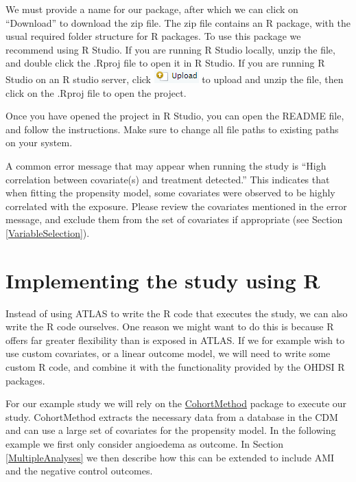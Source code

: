 \documentclass[11pt]{book}
\theoremstyle{definition}
\theoremstyle{definition}
\theoremstyle{definition}
\theoremstyle{remark}
\begin{document}
We must provide a name for our package, after which we can click on ``Download'' to download the zip file. The zip file contains an R package, with the usual required folder structure for R packages. \citep{Wickham_2015} To use this package we recommend using R Studio. If you are running R Studio locally, unzip the file, and double click the .Rproj file to open it in R Studio. If you are running R Studio on an R studio server, click \includegraphics{images/PopulationLevelEstimation/upload.png} to upload and unzip the file, then click on the .Rproj file to open the project.

Once you have opened the project in R Studio, you can open the README file, and follow the instructions. Make sure to change all file paths to existing paths on your system.

A common error message that may appear when running the study is ``High correlation between covariate(s) and treatment detected.'' This indicates that when fitting the propensity model, some covariates were observed to be highly correlated with the exposure. Please review the covariates mentioned in the error message, and exclude them from the set of covariates if appropriate (see Section \ref{VariableSelection}). 

\hypertarget{pleR}{%
\section{Implementing the study using R}\label{pleR}}

Instead of using ATLAS to write the R code that executes the study, we can also write the R code ourselves. One reason we might want to do this is because R offers far greater flexibility than is exposed in ATLAS. If we for example wish to use custom covariates, or a linear outcome model, we will need to write some custom R code, and combine it with the functionality provided by the OHDSI R packages.

For our example study we will rely on the \href{https://ohdsi.github.io/CohortMethod/}{CohortMethod} package to execute our study. CohortMethod extracts the necessary data from a database in the CDM and can use a large set of covariates for the propensity model. In the following example we first only consider angioedema as outcome. In Section \ref{MultipleAnalyses} we then describe how this can be extended to include AMI and the negative control outcomes.
\end{document}
